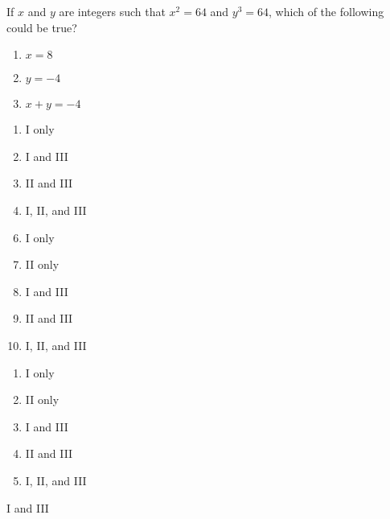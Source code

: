 






 If $x$ and $y$ are integers such that $x^2 = 64$ and
$y^3 =64$, which of the following could be true?

\begin{enumerate}[label=\Roman{*}.,leftmargin=1.5cm]
 \item $x = 8$
 \item $y = -4$
 \item $ x + y = -4$
\end{enumerate}


\ifsat
	\begin{enumerate}[label=\Alph*)]
		\item I only
		\item I and III%
		\item II and III
		\item I, II, and III
	\end{enumerate}
\else
\fi

\ifacteven
	\begin{enumerate}[label=\textbf{\Alph*.},itemsep=\fill,align=left]
		\setcounter{enumii}{5}
		\item I only
		\item II only
		\item I and III%
		\addtocounter{enumii}{1}
		\item II and III
		\item I, II, and III
	\end{enumerate}
\else
\fi

\ifactodd
	\begin{enumerate}[label=\textbf{\Alph*.},itemsep=\fill,align=left]
		\item I only
		\item II only
		\item I and III%
		\item II and III
		\item I, II, and III
	\end{enumerate}
\else
\fi

\ifgridin
 I and III%
		
\else
\fi

